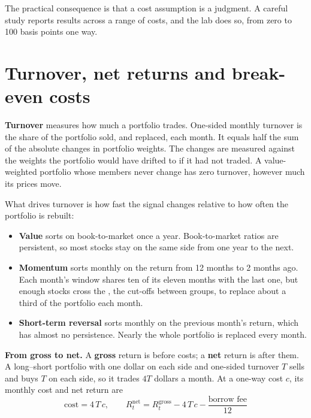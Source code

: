 The practical consequence is that a cost assumption is a judgment. A careful study reports results across a range of costs, and the lab does so, from zero to 100 basis points one way.

\section{Turnover, net returns and break-even costs}
\label{sec:17-turnover}

\textbf{Turnover} measures how much a portfolio trades. One-sided monthly turnover is the share of the portfolio sold, and replaced, each month. It equals half the sum of the absolute changes in portfolio weights. The changes are measured against the weights the portfolio would have drifted to if it had not traded. A value-weighted portfolio whose members never change has zero turnover, however much its prices move.

What drives turnover is how fast the signal changes relative to how often the portfolio is rebuilt:

\begin{itemize}
  \item \textbf{Value} sorts on book-to-market once a year. Book-to-market ratios are persistent, so most stocks stay on the same side from one year to the next.
  \item \textbf{Momentum} sorts monthly on the return from 12 months to 2 months ago. Each month's window shares ten of its eleven months with the last one, but enough stocks cross the , the cut-offs between groups, to replace about a third of the portfolio each month.
  \item \textbf{Short-term reversal} sorts monthly on the previous month's return, which has almost no persistence. Nearly the whole portfolio is replaced every month.
\end{itemize}

\textbf{From gross to net.} A \textbf{gross} return is before costs; a \textbf{net} return is after them. A long--short portfolio with one dollar on each side and one-sided turnover $T$ sells and buys $T$ on each side, so it trades $4T$ dollars a month. At a one-way cost $c$, its monthly cost and net return are
\begin{equation}
  \text{cost} = 4\,T\,c, \qquad R^{\text{net}}_t = R^{\text{gross}}_t - 4\,T\,c - \frac{\text{borrow fee}}{12}
  \label{eq:17-net}
\end{equation}

